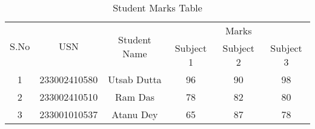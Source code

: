 \documentclass{article}
\begin{document}
\begin{table}[h!]
\centering
\begin{tabular}{|c|c|c|c|c|c|}
\hline
\multirow{2}{*}{S.No} & \multirow{2}{*}{USN} & \multirow{2}{*}{Student Name} & \multicolumn{3}{c|}{Marks} \\ \cline{4-6} 
                      &                      &                               & Subject 1 & Subject 2 & Subject 3 \\ \hline
1                     & 233002410580                & Utsab Dutta            & 96        & 90        & 98        \\ \hline
2                     & 233002410510                & Ram Das                    & 78        & 82        & 80        \\ \hline
3                     & 233001010537                & Atanu Dey                 & 65        & 87        & 78        \\ \hline
\end{tabular}
\caption{Student Marks Table}
\label{tab:student_marks}
\end{table}
\end{document}

